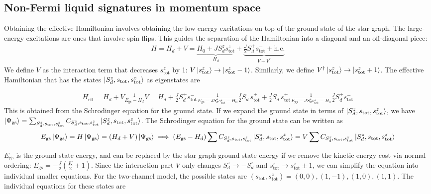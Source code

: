 \documentclass[reprint,prb,superscriptaddress]{revtex4-2}
\begin{document}
\subsection{Non-Fermi liquid signatures in momentum space}
Obtaining the effective Hamiltonian involves obtaining the low energy excitations on top of the ground state of the star graph. The large-energy excitations are ones that involve spin flips. This guides the separation of the Hamiltonian into a diagonal and an off-diagonal piece:
\begin{align}
	H = H_d + V = \underbrace{H_0 + J S_d^z s_\text{tot}^z}_{H_d} + \underbrace{\frac{J}{2}S_d^+ s_\text{tot}^- + \text{h.c.}}_{V + V^\dagger}
\end{align}
We define \(V\) as the interaction term that decreases \(s_\text{tot}^z\) by 1: \(V \ket{s_\text{tot}^z} \to \ket{s_\text{tot}^z - 1}\). Similarly, we define \(V^\dagger \ket{s_\text{tot}^z} \to \ket{s_\text{tot}^z + 1}\). The effective Hamiltonian that has the states \(\ket{S_d^z, s_\text{tot}, s_\text{tot}^z}\) as eigenstates are
\begin{widetext}
\begin{align}
	H_\text{eff} = H_d + V \frac{1}{E_\text{gs} - H_d}V = H_d + \frac{J}{2}S_d^+ s_\text{tot}^- \frac{1}{E_\text{gs} - J S_d^z s_\text{tot}^z - H_0}\frac{J}{2}S_d^- s_\text{tot}^+ +\frac{J}{2}S_d^- s_\text{tot}^+ \frac{1}{E_\text{gs} - J S_d^z s_\text{tot}^z - H_0}\frac{J}{2}S_d^+ s_\text{tot}^-
\end{align}
This is obtained from the Schrodinger equation for the ground state. If we expand the ground state in terms of \(\ket{S_d^z, s_\text{tot}, s_\text{tot}^z}\), we have  \(\ket{\Psi_\text{gs}} = \sum_{S_d^z, s_\text{tot},s_\text{tot}^z}C_{S_d^z, s_\text{tot},s_\text{tot}^z}\ket{S_d^z, s_\text{tot}, s_\text{tot}^z}\). The Schrodinger equation for the ground state can be written as
\begin{align}
	E_\text{gs}\ket{\Psi_\text{gs}} = H \ket{\Psi_\text{gs}} = \left(H_d + V\right)\ket{\Psi_\text{gs}} \implies \left(E_\text{gs} - H_d\right)\sum C_{S_d^z, s_\text{tot},s_\text{tot}^z}\ket{S_d^z, s_\text{tot}, s_\text{tot}^z} = V\sum C_{S_d^z, s_\text{tot},s_\text{tot}^z}\ket{S_d^z, s_\text{tot}, s_\text{tot}^z}
\end{align}
\end{widetext}
\(E_\text{gs}\) is the ground state energy, and can be replaced by the star graph ground state energy if we remove the kinetic energy cost via normal ordering: \(E_\text{gs} = -\frac{J}{2}\left(\frac{K}{2}+1\right) \). Since the interaction part \(V\) only changes \(S_d^z \to -S_d^z\) and \(s^z_\text{tot} \to s^z_\text{tot} \pm 1\), we can simplify the equation into individual smaller equations. For the two-channel model, the possible states are \((s_\text{tot},s^z_\text{tot}) = (0,0), (1,-1), (1,0), (1,1)\). The individual equations for these states are
\end{document}
